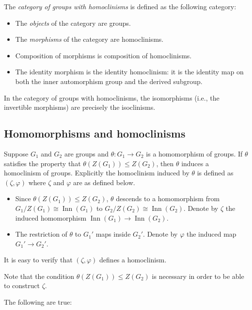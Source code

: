 \documentclass{ucetd}
\begin{document}
\begin{definer}
  The {\em category of groups with homoclinisms} is defined as the
  following category:

  \begin{itemize}
  \item The {\em objects} of the category are groups.
  \item The {\em morphisms} of the category are homoclinisms.
  \item Composition of morphisms is composition of homoclinisms.
  \item The identity morphism is the identity homoclinism: it is the
    identity map on both the inner automorphism group and the derived
    subgroup.
  \end{itemize}
\end{definer}

In the category of groups with homoclinisms, the isomorphisms (i.e.,
the invertible morphisms) are precisely the isoclinisms.

\subsection{Homomorphisms and homoclinisms}

Suppose $G_1$ and $G_2$ are groups and $\theta: G_1 \to G_2$ is a
homomorphism of groups. If $\theta$ satisfies the property that
$\theta(Z(G_1)) \le Z(G_2)$, then $\theta$ induces a homoclinism of
groups. Explicitly the homoclinism induced by $\theta$ is defined as
$(\zeta,\varphi)$ where $\zeta$ and $\varphi$ are as defined below.

\begin{itemize}
\item Since $\theta(Z(G_1)) \le Z(G_2)$, $\theta$ descends to a
  homomorphism from $G_1/Z(G_1) \cong \operatorname{Inn}(G_1)$ to
  $G_2/Z(G_2) \cong \operatorname{Inn}(G_2)$. Denote by $\zeta$ the
  induced homomorphism $\operatorname{Inn}(G_1) \to
  \operatorname{Inn}(G_2)$.
\item The restriction of $\theta$ to $G_1'$ maps inside $G_2'$. Denote
  by $\varphi$ the induced map $G_1' \to G_2'$.
\end{itemize}

It is easy to verify that $(\zeta,\varphi)$ defines a homoclinism.

Note that the condition $\theta(Z(G_1)) \le Z(G_2)$ is necessary in
order to be able to construct $\zeta$.

The following are true:
\end{document}
